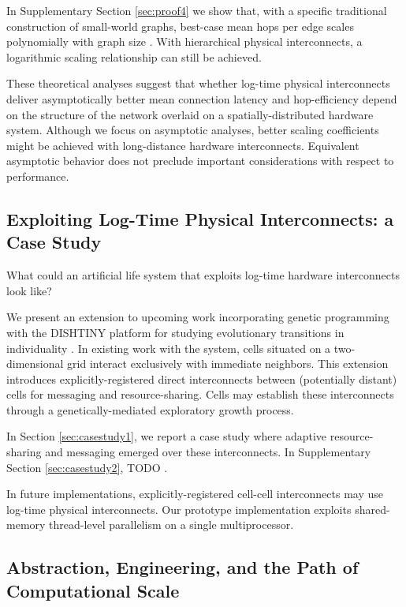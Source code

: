 In Supplementary Section \ref{sec:proof4} we show that, with a specific traditional construction of small-world graphs, best-case mean hops per edge scales polynomially with graph size \citep{Moreno_Ofria_2020}.
With hierarchical physical interconnects, a logarithmic scaling relationship can still be achieved.

These theoretical analyses suggest that whether log-time physical interconnects deliver asymptotically better mean connection latency and hop-efficiency depend on the structure of the network overlaid on a spatially-distributed hardware system.
Although we focus on asymptotic analyses, better scaling coefficients might be achieved with long-distance hardware interconnects.
Equivalent asymptotic behavior does not preclude important considerations with respect to performance.

\subsection{Exploiting Log-Time Physical Interconnects: a Case Study}

What could an artificial life system that exploits log-time hardware interconnects look like?

We present an extension to upcoming work incorporating genetic programming with the DISHTINY platform for studying evolutionary transitions in individuality \citep{moreno2019toward}.
In existing work with the system, cells situated on a two-dimensional grid interact exclusively with immediate neighbors.
This extension introduces explicitly-registered direct interconnects between (potentially distant) cells for messaging and resource-sharing.
Cells may establish these interconnects through a genetically-mediated exploratory growth process.

In Section \ref{sec:casestudy1}, we report a case study where adaptive resource-sharing and messaging emerged over these interconnects.
In Supplementary Section \ref{sec:casestudy2}, TODO \citep{Moreno_Ofria_2020}.

In future implementations, explicitly-registered cell-cell interconnects may use log-time physical interconnects.
Our prototype implementation exploits shared-memory thread-level parallelism on a single multiprocessor.

\subsection{Abstraction, Engineering, and the Path of Computational Scale}

